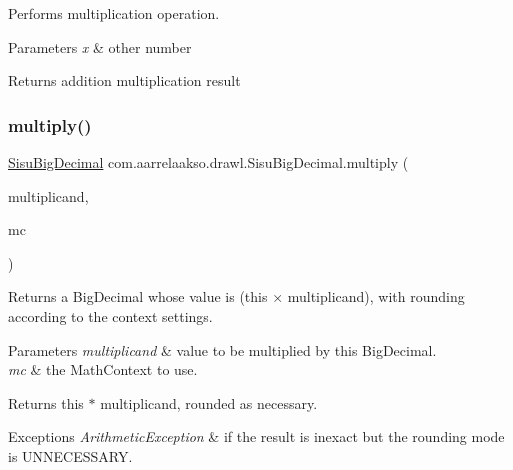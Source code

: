 Performs multiplication operation.


\begin{DoxyParams}{Parameters}
{\em x} & other number \\
\hline
\end{DoxyParams}
\begin{DoxyReturn}{Returns}
addition multiplication result 
\end{DoxyReturn}
\mbox{\label{classcom_1_1aarrelaakso_1_1drawl_1_1_sisu_big_decimal_a3315f77c2c03249816eacafd25a1d0ab}} 
\subsubsection{\texorpdfstring{multiply()}{multiply()}\hspace{0.1cm}{\footnotesize\ttfamily [2/3]}}
{\footnotesize\ttfamily \hyperlink{classcom_1_1aarrelaakso_1_1drawl_1_1_sisu_big_decimal}{Sisu\+Big\+Decimal} com.\+aarrelaakso.\+drawl.\+Sisu\+Big\+Decimal.\+multiply (\begin{DoxyParamCaption}\item[{\hyperlink{classcom_1_1aarrelaakso_1_1drawl_1_1_sisu_big_decimal}{Sisu\+Big\+Decimal}}]{multiplicand,  }\item[{Math\+Context}]{mc }\end{DoxyParamCaption})\hspace{0.3cm}{\ttfamily [protected]}}

Returns a Big\+Decimal whose value is (this × multiplicand), with rounding according to the context settings.


\begin{DoxyParams}{Parameters}
{\em multiplicand} & value to be multiplied by this Big\+Decimal. \\
\hline
{\em mc} & the Math\+Context to use. \\
\hline
\end{DoxyParams}
\begin{DoxyReturn}{Returns}
this $\ast$ multiplicand, rounded as necessary. 
\end{DoxyReturn}

\begin{DoxyExceptions}{Exceptions}
{\em Arithmetic\+Exception} & if the result is inexact but the rounding mode is U\+N\+N\+E\+C\+E\+S\+S\+A\+RY. \\
\hline
\end{DoxyExceptions}
\mbox{\label{classcom_1_1aarrelaakso_1_1drawl_1_1_sisu_big_decimal_a629f43082e518f55326ca0efcffad3b5}} 
